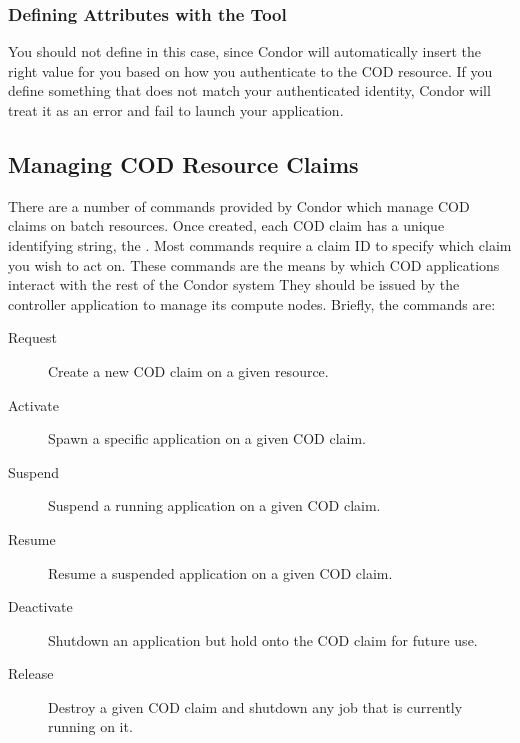 \subsubsection{\label{sec:cod-command-line-attrs}
Defining Attributes with the  Tool} 

\Todo

\Note You should not define  in this case, since Condor
will automatically insert the right value for you based on how you
authenticate to the COD resource.  
If you define something that does not match your authenticated
identity, Condor will treat it as an error and fail to launch your
application. 


\subsection{\label{sec:cod-managing-claims}
Managing COD Resource Claims}

There are a number of commands provided by Condor which manage COD
claims on batch resources.
Once created, each COD claim has a unique identifying string, the
.
Most commands require a claim ID to specify which claim you wish to
act on. 
These commands are the means by which COD applications interact with
the rest of the Condor system
They should be issued by the controller application to manage its
compute nodes.
Briefly, the commands are:

\begin{description}

\item [Request] Create a new COD claim on a given resource.

\item [Activate] Spawn a specific application on a given COD claim.

\item [Suspend] Suspend a running application on a given COD claim.

\item [Resume] Resume a suspended application on a given COD claim.

\item [Deactivate] Shutdown an application but hold onto the COD claim
  for future use.

\item [Release] Destroy a given COD claim and shutdown any job that is
  currently running on it.

\end{description}

